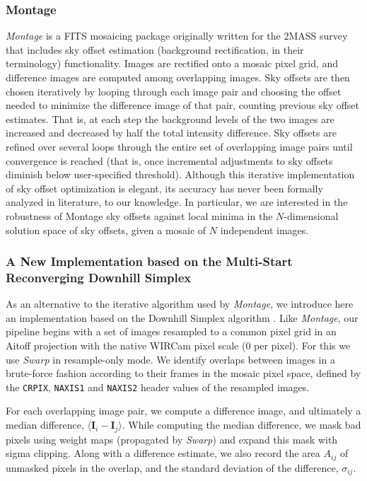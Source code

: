 \documentclass[iop]{emulateapj}
\newcommand{\vect}[1]{\boldsymbol{#1}} %
\newcommand{\sw}[1]{\textit{#1}} %
\begin{document}
\subsubsection{Montage}
\label{sec:montage_algo}

\sw{Montage} is a FITS mosaicing package \citep{Berriman:2008} originally written for the 2MASS survey that includes sky offset estimation (background rectification, in their terminology) functionality.
Images are rectified onto a mosaic pixel grid, and difference images are computed among overlapping images.
Sky offsets are then chosen iteratively by looping through each image pair and choosing the offset needed to minimize the difference image of that pair, counting previous sky offset estimates.
That is, at each step the background levels of the two images are increased and decreased by half the total intensity difference.
Sky offsets are refined over several loops through the entire set of overlapping image pairs until convergence is reached (that is, once incremental adjustments to sky offsets diminish below user-specified threshold).
Although this iterative implementation of sky offset optimization is elegant, its accuracy has never been formally analyzed in literature, to our knowledge.
In particular, we are interested in the robustness of Montage sky offsets against local minima in the $N$-dimensional solution space of sky offsets, given a mosaic of $N$ independent images.

\subsubsection{A New Implementation based on the Multi-Start Reconverging Downhill Simplex}
\label{sec:msrnm_algo}

As an alternative to the iterative algorithm used by \sw{Montage}, we introduce here an implementation based on the Downhill Simplex algorithm \cite[][hereafter, NM]{Nelder:1965}.
Like \sw{Montage}, our pipeline begins with a set of images resampled to a common pixel grid in an Aitoff projection with the native WIRCam pixel scale (0 per pixel).
For this we use \sw{Swarp} in resample-only mode.
We identify overlaps between images in a brute-force fashion according to their frames in the mosaic pixel space, defined by the \texttt{CRPIX}, \texttt{NAXIS1} and \texttt{NAXIS2} header values of the resampled images.

For each overlapping image pair, we compute a difference image, and ultimately a median difference, $\langle \vect{I}_i - \vect{I}_j \rangle$.
While computing the median difference, we mask bad pixels using weight maps (propagated by \sw{Swarp}) and expand this mask with sigma clipping.
Along with a difference estimate, we also record the area $A_{ij}$ of unmasked pixels in the overlap, and the standard deviation of the difference, $\sigma_{ij}$.
\end{document}
